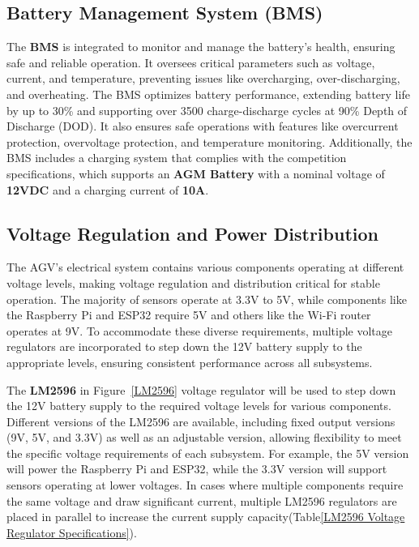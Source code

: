 \documentclass[../../main]{subfiles}
\begin{document}
\subsection{Battery Management System (BMS)}
The \textbf{BMS} is integrated to monitor and manage the battery's health, 
ensuring safe and reliable operation. It oversees critical parameters such as voltage, current, and temperature,
preventing issues like overcharging, over-discharging, and overheating. The BMS optimizes battery performance, 
extending battery life by up to 30\% and supporting over 3500 charge-discharge cycles at 90\% Depth of Discharge (DOD). 
It also ensures safe operations with features like overcurrent protection, overvoltage protection, and temperature monitoring. 
Additionally, the BMS includes a charging system that complies with the competition specifications, 
which supports an \textbf{AGM Battery} with a nominal voltage of \textbf{12VDC} and a charging current of \textbf{10A}.

\subsection{Voltage Regulation and Power Distribution}

The AGV's electrical system contains various components operating 
at different voltage levels, making voltage regulation and 
distribution critical for stable operation. The majority of 
sensors operate at 3.3V to 5V, while components like the Raspberry Pi 
and ESP32 require 5V and others like the Wi-Fi router operates at 9V. 
To accommodate these diverse requirements, multiple voltage regulators 
are incorporated to step down the 12V battery supply to the appropriate 
levels, ensuring consistent performance across all subsystems. 

\newpage
The \textbf{LM2596} in Figure~\ref{LM2596} voltage regulator will be used to step down the 12V battery 
supply to the required voltage levels for various components. Different 
versions of the LM2596 are available, including fixed output versions 
(9V, 5V, and 3.3V) as well as an adjustable version, allowing flexibility 
to meet the specific voltage requirements of each subsystem. For example, 
the 5V version will power the Raspberry Pi and ESP32, while the 3.3V version 
will support sensors operating at lower voltages. In cases where multiple 
components require the same voltage and draw significant current, multiple 
LM2596 regulators are placed in parallel to increase the current supply 
capacity(Table\ref{LM2596 Voltage Regulator Specifications}).
\end{document}
